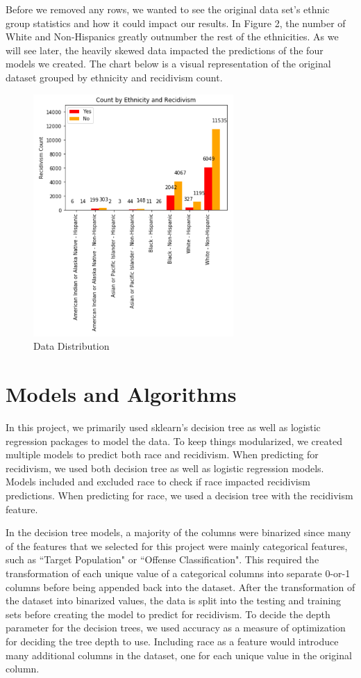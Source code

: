 \documentclass[11pt, sigconf]{acmart}
\begin{document}
Before we removed any rows, we wanted to see the original data set's ethnic group statistics and how it could impact our results. In Figure 2, the number of White and Non-Hispanics greatly outnumber the rest of the ethnicities. As we will see later, the heavily skewed data impacted the predictions of the four models we created. The chart below is a visual representation of the original dataset grouped by ethnicity and recidivism count. 

\begin{figure}[h] 	
\centering
\includegraphics[width=3in]{1.png}
\caption{Data Distribution}
\end{figure}

\section{Models and Algorithms}

\hspace{5mm} In this project, we primarily used sklearn’s decision tree as well as logistic regression packages to model the data. To keep things modularized, we created multiple models to predict both race and recidivism. When predicting for recidivism, we used both decision tree as well as logistic regression models. Models included and excluded race to check if race impacted recidivism predictions. When predicting for race, we used a decision tree with the recidivism feature.

In the decision tree models, a majority of the columns were binarized since many of the features that we selected for this project were mainly categorical features, such as ``Target Population" or ``Offense Classification". This required the transformation of each unique value of a categorical columns into separate 0-or-1 columns before being appended back into the dataset. After the transformation of the dataset into binarized values, the data is split into the testing and training sets before creating the model to predict for recidivism. To decide the depth parameter for the decision trees, we used accuracy as a measure of optimization for deciding the tree depth to use. Including race as a feature would introduce many additional columns in the dataset, one for each unique value in the original column. 
\end{document}
